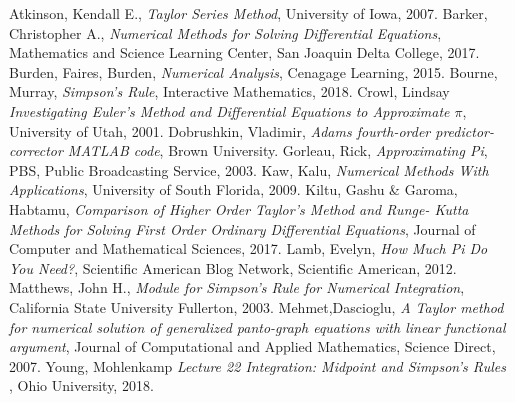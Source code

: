 \documentclass[letterpaper,12pt]{article}
\begin{document}
\pagebreak

\begin{thebibliography}{9}
  Atkinson, Kendall E.,
  \textit{Taylor Series Method},
  University of Iowa,
  2007.
  Barker, Christopher A.,
  \textit{Numerical Methods for Solving Differential Equations},
  Mathematics and Science Learning Center, San Joaquin Delta College,
  2017.
  Burden, Faires, Burden,
  \textit{Numerical Analysis},
  Cenagage Learning, 
  2015.
  Bourne, Murray,
  \textit{Simpson's Rule},
  Interactive Mathematics, 
  2018.
  Crowl, Lindsay
  \textit{Investigating Euler’s Method and Differential Equations to Approximate $\pi$},
  University of Utah, 
  2001.
  Dobrushkin, Vladimir,
  \textit{Adams fourth-order predictor-corrector MATLAB code},
  Brown University.
  Gorleau, Rick,
  \textit{Approximating Pi},
  PBS, Public Broadcasting Service,
  2003.
  Kaw, Kalu,
  \textit{Numerical Methods With Applications},
  University of South Florida, 
  2009.
  Kiltu, Gashu & Garoma, Habtamu,
  \textit{Comparison of Higher Order Taylor's Method and Runge- Kutta Methods for Solving First Order Ordinary Differential Equations},
  Journal of Computer and Mathematical Sciences,
  2017.
  Lamb, Evelyn,
  \textit{How Much Pi Do You Need?},
  Scientific American Blog Network, Scientific American,
  2012.
  Matthews, John H.,
  \textit{Module for Simpson's Rule for Numerical Integration},
  California State University Fullerton,
  2003.
  Mehmet,Dascioglu,
  \textit{A Taylor method for numerical solution of generalized panto-graph equations with linear functional argument},
  Journal of Computational and Applied Mathematics, Science Direct,
  2007.
  Young, Mohlenkamp
  \textit{Lecture 22
Integration: Midpoint and Simpson’s Rules
},
  Ohio University,
  2018.
\end{thebibliography}
\end{document}
